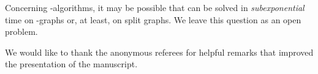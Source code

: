 \documentclass[
final
]{dmtcs-episciences}
\begin{document}
Concerning {}-algorithms, it may be possible that {} can be solved in {\sl subexponential} time on -graphs or, at least, on split graphs. We leave this question as an open problem.



\acknowledgements
\label{sec:ack}
We would like to thank the anonymous referees for helpful remarks that improved the presentation of the manuscript.


	

\label{sec:biblio}
\end{document}
